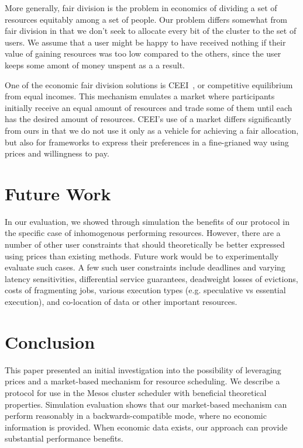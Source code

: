 \documentclass{acm_proc_article-sp}
\begin{document}
More generally, fair division is the problem in economics of dividing a set of
resources equitably among a set of people. Our problem differs somewhat from
fair division in that we don't seek to allocate every bit of the cluster to the
set of users. We assume that a user might be happy to have received nothing if
their value of gaining resources was too low compared to the others, since the
user keeps some amont of money unspent as a a result.

One of the economic fair division solutions is CEEI~\cite{moulin2004fair}, or
competitive equilibrium from equal incomes. This mechanism emulates a market
where participants initially receive an equal amount of resources and trade some
of them until each has the desired amount of resources. CEEI's use of a market
differs significantly from ours in that we do not use it only as a vehicle for
achieving a fair allocation, but also for frameworks to express their
preferences in a fine-grianed way using prices and willingness to pay.

\section{Future Work}
\label{sec:future}

In our evaluation, we showed through simulation the benefits of our protocol in the specific case of inhomogenous performing resources. However, there are a number of other user constraints that should theoretically be better expressed using prices than existing methods. Future work would be to experimentally evaluate such cases. A few such user constraints include deadlines and varying latency sensitivities, differential service guarantees, deadweight losses of evictions, costs of fragmenting jobs, various execution types (e.g. speculative vs essential execution), and co-location of data or other important resources.

\section{Conclusion}
\label{sec:conclusion}

This paper presented an initial investigation into the possibility of leveraging prices and a market-based mechanism for resource scheduling. We describe a protocol for use in the Mesos cluster scheduler with beneficial theoretical properties. Simulation evaluation shows that our market-based mechanism can perform reasonably in a backwards-compatible mode, where no economic information is provided. When economic data exists, our approach can provide substantial performance benefits.
\end{document}
